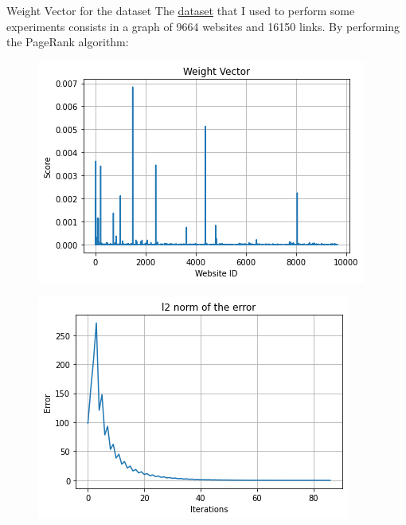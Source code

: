 \documentclass[10pt]{beamer}
\begin{document}
\begin{frame}{Weight Vector for the dataset}
The \href{www.cs.cornell.edu/courses/cs685/2002fa/data/gr0.California}{dataset} that I used to perform some experiments consists in a graph of 9664 websites and 16150 links. By performing the PageRank algorithm:
\begin{center}
\begin{figure}[h] 
\centering 
\includegraphics[scale=0.4]{pi}
\end{figure}
\end{center}
\begin{center}
\begin{figure}[h] 
\centering 
\includegraphics[scale=0.3]{error}
\end{figure}
\end{center}
\end{frame}
\end{document}

